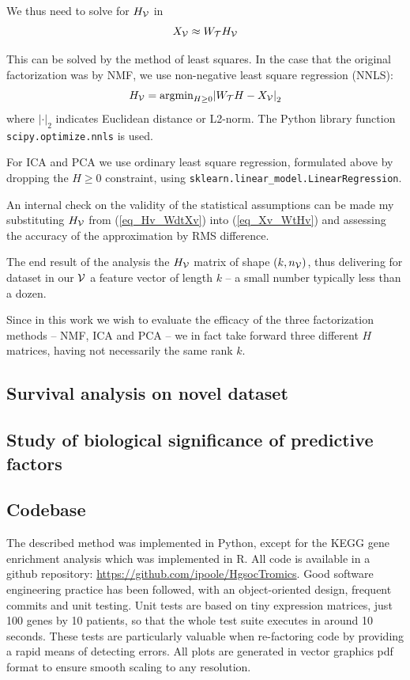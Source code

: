 \documentclass[tikz, 12pt,a4paper,oneside,fleqn]{article}
\begin{document}
We thus need to solve for $H_{\mathcal{V}}$ in
\begin{equation}
	X_{\mathcal{V}}  \approx  W_{\mathcal{T}} H_{\mathcal{V}} \label{eq_Xv_WtHv}
\end{equation}

This can be solved by the method of least squares.  In the case that the original factorization was by NMF, we use non-negative least square regression (NNLS):
\begin{equation}
	H_{\mathcal{V}} = \mbox{argmin}_{H\geq 0}{\lvert W_{\mathcal{T}} H - X_{\mathcal{V}} \rvert}_2
	\label{eq_Hv_WdtXv}
\end{equation}
where ${\lvert \mathbf{\cdot} \rvert}_2$ indicates Euclidean distance or L2-norm.
The Python library function {\tt scipy.optimize.nnls} is used.

For ICA and PCA we use ordinary least square regression, formulated above by dropping the $H\geq 0$ constraint, using {\tt sklearn.linear\_model.LinearRegression}.

An internal check on the validity of the statistical assumptions can be made my substituting  $H_{\mathcal{V}}$ from (\ref{eq_Hv_WdtXv}) into (\ref{eq_Xv_WtHv}) and assessing the accuracy of the approximation by RMS difference.

The end result of the analysis the $H_{\mathcal{V}}$ matrix of shape $(k, n_{\mathcal{V}})$, thus delivering for dataset in our $\mathcal{V}$ a feature vector of length $k$ -- a small number typically less than a dozen.

Since in this work we wish to evaluate the efficacy of the three factorization methods -- NMF, ICA and PCA -- we in fact take forward three different $H$ matrices, having not necessarily the same rank $k$.

\subsection{Survival analysis on novel dataset}

\subsection{Study of biological significance of predictive factors}

\subsection{Codebase}

The described method was implemented in Python, except for the KEGG gene enrichment analysis which was implemented in R.  All code is available in a github repository: \url{https://github.com/ipoole/HgsocTromics}.  Good software engineering practice has been followed, with an object-oriented design, frequent commits and unit testing.  Unit tests are based on tiny expression matrices, just 100 genes by 10 patients, so that the whole test suite executes in around 10 seconds.  These tests are particularly valuable when re-factoring code by providing a rapid means of detecting errors.  All plots are generated in vector graphics pdf format to ensure smooth scaling to any resolution. 
\end{document}
